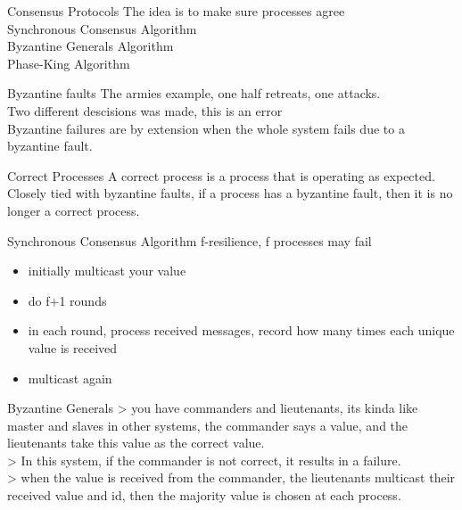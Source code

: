 \documentclass[aspectratio=1610,17pt,utf8]{beamer}
\begin{document}

\begin{frame}{Consensus Protocols}
    The idea is to make sure processes agree\\
    Synchronous Consensus Algorithm\\
    Byzantine Generals Algorithm\\
    Phase-King Algorithm
\end{frame}


\begin{frame}{Byzantine faults}
    The armies example, one half retreats, one attacks.\\
    Two different descisions was made, this is an error\\
    Byzantine failures are by extension when the whole system fails due to a byzantine fault.
\end{frame}

\begin{frame}{Correct Processes}
    A correct process is a process that is operating as expected. Closely tied with byzantine faults, if a process has a byzantine fault, then it is no longer a correct process.
\end{frame}

\begin{frame}{Synchronous Consensus Algorithm}
    f-resilience, f processes may fail
    \begin{itemize}
        \item initially multicast your value
        \item do f+1 rounds
        \item in each round, process received messages, record how many times each unique value is received
        \item multicast again
    \end{itemize}
\end{frame}

\begin{frame}{Byzantine Generals}
    > you have commanders and lieutenants, its kinda like master and slaves in other systems, the commander says a value, and the lieutenants take this value as the correct value.\\
    > In this system, if the commander is not correct, it results in a failure.\\
    > when the value is received from the commander, the lieutenants multicast their received value and id, then the majority value is chosen at each process.
\end{frame}
\end{document}

